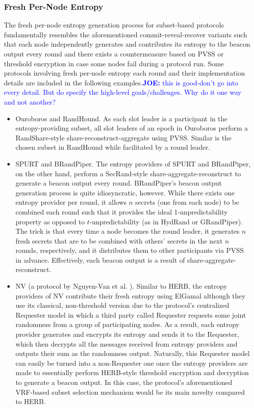 \documentclass[letterpaper,twocolumn,10pt]{article}
\theoremstyle{definition}
\theoremstyle{remark}
\newcommand{\joenote}[1]{\textcolor{blue}{\textbf{JOE:} #1}}
\begin{document}
\subsubsection{Fresh Per-Node Entropy}
The fresh per-node entropy generation process for subset-based protocols fundamentally resembles the aforementioned commit-reveal-recover variants such that each node independently generates and contributes its entropy to the beacon output every round and there exists a countermeasure based on PVSS or threshold encryption in case some nodes fail during a protocol run. Some protocols involving fresh per-node entropy each round and their implementation details are included in the following examples.\joenote{this is good-don't go into every detail. But do specify the high-level goals/challenges. Why do it one way and not another?}
\begin{itemize}
\item Ouroboros and RandHound. As each slot leader is a participant in the entropy-providing subset, all slot leaders of an epoch in Ouroboros perform a RandShare-style share-reconstruct-aggregate using PVSS. Similar is the chosen subset in RandHound while facilitated by a round leader.
\item SPURT and BRandPiper. The entropy providers of SPURT and BRandPiper, on the other hand, perform a SecRand-style share-aggregate-reconstruct to generate a beacon output every round. BRandPiper's beacon output generation process is quite idiosyncratic, however. While there exists one entropy provider per round, it allows $n$ secrets (one from each node) to be combined each round such that it provides the ideal 1-unpredictability property as opposed to $t$-unpredictability (as in HydRand or GRandPiper). The trick is that every time a node becomes the round leader, it generates $n$ fresh secrets that are to be combined with others' secrets in the next $n$ rounds, respectively, and it distributes them to other participants via PVSS in advance. Effectively, each beacon output is a result of share-aggregate-reconstruct.
\item NV (a protocol by Nguyen-Van et al. \cite{nguyen2019scalable}). Similar to HERB, the entropy providers of NV contribute their fresh entropy using ElGamal although they use its classical, non-threshold version due to the protocol's centralized Requester model in which a third party called Requester requests some joint randomness from a group of participating nodes. As a result, each entropy provider generates and encrypts its entropy and sends it to the Requester, which then decrypts all the messages received from entropy providers and outputs their sum as the randomness output. Naturally, this Requester model can easily be turned into a non-Requester one once the entropy providers are made to essentially perform HERB-style threshold encryption and decryption to generate a beacon output. In this case, the protocol's aforementioned VRF-based subset selection mechanism would be its main novelty compared to HERB.
\end{itemize}
\end{document}
